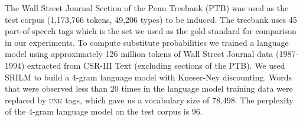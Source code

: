 The Wall Street Journal Section of the Penn Treebank (PTB) \cite{treebank3}
was used as the test corpus (1,173,766 tokens, 49,206 types) to be
induced.
The treebank uses 45 part-of-speech tags which is the set we used as
the gold standard for comparison in our experiments.
To compute substitute probabilities we trained a language model using
approximately 126 million tokens of Wall Street Journal data
(1987-1994) extracted from CSR-III Text \cite{csr3text} (excluding
sections of the PTB).
We used SRILM \cite{Stolcke2002} to build a 4-gram language model with
Kneser-Ney discounting.
Words that were observed less than 20 times in the language model
training data were replaced by \textsc{unk} tags, which gave us a
vocabulary size of 78,498.
The perplexity of the 4-gram language model on the test corpus is 96.
